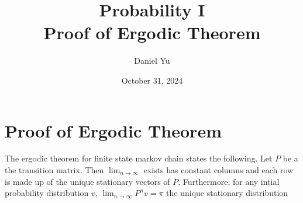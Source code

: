 \documentclass[a4paper]{article}
\title{\Huge{Probability I}\\ Proof of Ergodic Theorem}
\author{\huge{Daniel Yu}}
\date{October 31, 2024}
\begin{document}
\maketitle
\newpage%
\tableofcontents
\pagebreak

\section{Proof of Ergodic Theorem}
\begin{note}
    The ergodic theorem for finite state markov chain states the following. Let $P$ be a the transition matrix. Then $\lim_{n \to \infty}$ exists has constant columns and each row is made up of the unique stationary vectors of $P$. Furthermore, for any intial probability distribution $v$,  $\lim_{n \to \infty} P^{n} v = \pi $ the unique stationary distribution\\ 
\end{note}
\end{document}
